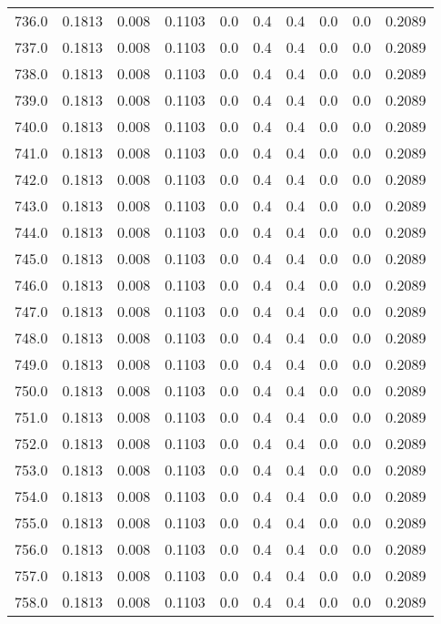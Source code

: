 \begin{longtable}{lrrrrrrrrr}
736.0 & 0.1813 & 0.008 & 0.1103 & 0.0 & 0.4 & 0.4 & 0.0 & 0.0 & 0.2089 \\
737.0 & 0.1813 & 0.008 & 0.1103 & 0.0 & 0.4 & 0.4 & 0.0 & 0.0 & 0.2089 \\
738.0 & 0.1813 & 0.008 & 0.1103 & 0.0 & 0.4 & 0.4 & 0.0 & 0.0 & 0.2089 \\
739.0 & 0.1813 & 0.008 & 0.1103 & 0.0 & 0.4 & 0.4 & 0.0 & 0.0 & 0.2089 \\
740.0 & 0.1813 & 0.008 & 0.1103 & 0.0 & 0.4 & 0.4 & 0.0 & 0.0 & 0.2089 \\
741.0 & 0.1813 & 0.008 & 0.1103 & 0.0 & 0.4 & 0.4 & 0.0 & 0.0 & 0.2089 \\
742.0 & 0.1813 & 0.008 & 0.1103 & 0.0 & 0.4 & 0.4 & 0.0 & 0.0 & 0.2089 \\
743.0 & 0.1813 & 0.008 & 0.1103 & 0.0 & 0.4 & 0.4 & 0.0 & 0.0 & 0.2089 \\
744.0 & 0.1813 & 0.008 & 0.1103 & 0.0 & 0.4 & 0.4 & 0.0 & 0.0 & 0.2089 \\
745.0 & 0.1813 & 0.008 & 0.1103 & 0.0 & 0.4 & 0.4 & 0.0 & 0.0 & 0.2089 \\
746.0 & 0.1813 & 0.008 & 0.1103 & 0.0 & 0.4 & 0.4 & 0.0 & 0.0 & 0.2089 \\
747.0 & 0.1813 & 0.008 & 0.1103 & 0.0 & 0.4 & 0.4 & 0.0 & 0.0 & 0.2089 \\
748.0 & 0.1813 & 0.008 & 0.1103 & 0.0 & 0.4 & 0.4 & 0.0 & 0.0 & 0.2089 \\
749.0 & 0.1813 & 0.008 & 0.1103 & 0.0 & 0.4 & 0.4 & 0.0 & 0.0 & 0.2089 \\
750.0 & 0.1813 & 0.008 & 0.1103 & 0.0 & 0.4 & 0.4 & 0.0 & 0.0 & 0.2089 \\
751.0 & 0.1813 & 0.008 & 0.1103 & 0.0 & 0.4 & 0.4 & 0.0 & 0.0 & 0.2089 \\
752.0 & 0.1813 & 0.008 & 0.1103 & 0.0 & 0.4 & 0.4 & 0.0 & 0.0 & 0.2089 \\
753.0 & 0.1813 & 0.008 & 0.1103 & 0.0 & 0.4 & 0.4 & 0.0 & 0.0 & 0.2089 \\
754.0 & 0.1813 & 0.008 & 0.1103 & 0.0 & 0.4 & 0.4 & 0.0 & 0.0 & 0.2089 \\
755.0 & 0.1813 & 0.008 & 0.1103 & 0.0 & 0.4 & 0.4 & 0.0 & 0.0 & 0.2089 \\
756.0 & 0.1813 & 0.008 & 0.1103 & 0.0 & 0.4 & 0.4 & 0.0 & 0.0 & 0.2089 \\
757.0 & 0.1813 & 0.008 & 0.1103 & 0.0 & 0.4 & 0.4 & 0.0 & 0.0 & 0.2089 \\
758.0 & 0.1813 & 0.008 & 0.1103 & 0.0 & 0.4 & 0.4 & 0.0 & 0.0 & 0.2089 \\

\end{longtable}

